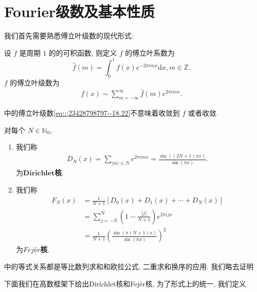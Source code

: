 \documentclass[../../main.tex]{subfiles}%
\begin{document}
\section{Fourier级数及基本性质}

我们首先需要熟悉傅立叶级数的现代形式:

\begin{definition}\label{definition:定义18.2}
设 $f$ 是周期 $1$ 的的可积函数, 则定义 $f$ 的傅立叶系数为
\[
\hat{f}(m) = \int_{0}^{1} f(x) e^{-2\pi i m x} \mathrm{d}x, m \in \mathbb{Z}.
\]
$f$ 的傅立叶级数为
\begin{align*}
f(x) \sim \sum_{m = -\infty}^{\infty} \hat{f}(m) e^{2\pi i m x}.
\end{align*}
\end{definition}
\begin{remark}
中的傅立叶级数\eqref{eq::;23428798797--18.22}不意味着收敛到 $f$ 或者收敛.
\end{remark}

\begin{definition}\label{definition:定义18.3}
对每个 $N \in \mathbb{N}_0$,
\begin{enumerate}
\item 我们称
\begin{align*}
D_N(x) = \sum_{|m| \leqslant N} e^{2\pi i m x} = \frac{\sin((2N + 1)\pi x)}{\sin(\pi x)}. 
\end{align*}
为$\mathbf{Dirichlet}$\textbf{核}.

\item 我们称
\begin{align*}
F_N(x) &= \frac{1}{N + 1}[D_0(x) + D_1(x) + \cdots + D_N(x)] \\
&= \sum_{j = -N}^{N} \left(1 - \frac{|j|}{N + 1}\right) e^{2\pi i j x} \\
&= \frac{1}{N + 1} \left( \frac{\sin(\pi (N + 1) x)}{\sin(\pi x)} \right)^2
\end{align*}
为$Fejér$\textbf{核}.
\end{enumerate}
\end{definition}
\begin{remark}
中的等式关系都是等比数列求和和欧拉公式, 二重求和换序的应用. 我们略去证明
\end{remark}

下面我们在高数框架下给出Dirichlet核和Fejér核, 为了形式上的统一, 我们定义
\end{document}
